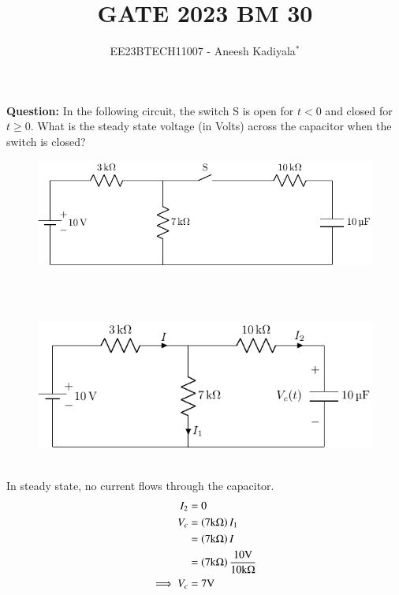 \documentclass[journal,12pt,twocolumn]{IEEEtran}
\theoremstyle{remark}
\begin{document}

\vspace{3cm}

\title{GATE 2023 BM 30}
\author{EE23BTECH11007 - Aneesh Kadiyala$^{*}$%
}
\maketitle
\newpage
\bigskip

\renewcommand{\thefigure}{\theenumi}
\renewcommand{\thetable}{\theenumi}

\vspace{3cm}
\textbf{Question:} In the following circuit, the switch S is open for $t < 0$ and closed for $t \ge 0$.
What is the steady state voltage (in Volts) across the capacitor when the switch is closed?
\begin{figure}[h!]
    \centering
    \includegraphics[width = \columnwidth]{2023/BM/30/figs/c_fig1.pdf}
\end{figure}
\\
\solution
\\
\fi
\begin{figure}[h!]
    \centering
    \includegraphics[width=\columnwidth]{2023/BM/30/figs/c_fig3.pdf}
\end{figure}
\\
In steady state, no current flows through the capacitor.
\begin{align}
I_2 &= 0 \\
V_c &= \left(7\text{k}\ohm\right)I_1 \\
&= \left(7\text{k}\ohm\right)I \\
&= \left(7\text{k}\ohm\right)\frac{10\text{V}}{10\text{k}\ohm} \\
\implies V_c &= 7\text{V}
\end{align}
\end{document}
